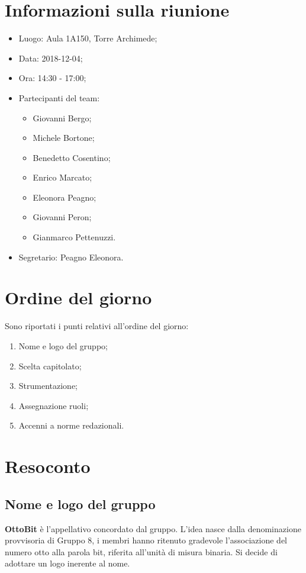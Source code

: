 \documentclass[11pt,a4paper]{article}
\begin{document}
	\section{Informazioni sulla riunione}
	\begin{itemize}
	\item Luogo: Aula 1A150, Torre Archimede;
	\item Data: 2018-12-04;
	\item Ora: 14:30 - 17:00;
	\item Partecipanti del team: 
	\begin{itemize}
		\item Giovanni Bergo;
		\item Michele Bortone;
		\item Benedetto Cosentino;
		\item Enrico Marcato;
		\item Eleonora Peagno;
		\item Giovanni Peron;
		\item Gianmarco Pettenuzzi.
	\end{itemize}
	\item Segretario: Peagno Eleonora.
	\end{itemize}

	\section{Ordine del giorno}
	Sono riportati i punti relativi all'ordine del giorno:
	\begin{enumerate}
	\item Nome e logo del gruppo;
	\item Scelta capitolato;
	\item Strumentazione;
	\item Assegnazione ruoli;
	\item Accenni a norme redazionali.
	\end{enumerate}
	
	\section{Resoconto}	
	\subsection{Nome e logo del gruppo}
	\textbf{OttoBit} è l'appellativo concordato dal gruppo. L'idea nasce dalla denominazione provvisoria di Gruppo 8, i membri hanno ritenuto gradevole l'associazione del numero otto alla parola bit, riferita all'unità di misura binaria. Si decide di adottare un logo inerente al nome.
\end{document}
